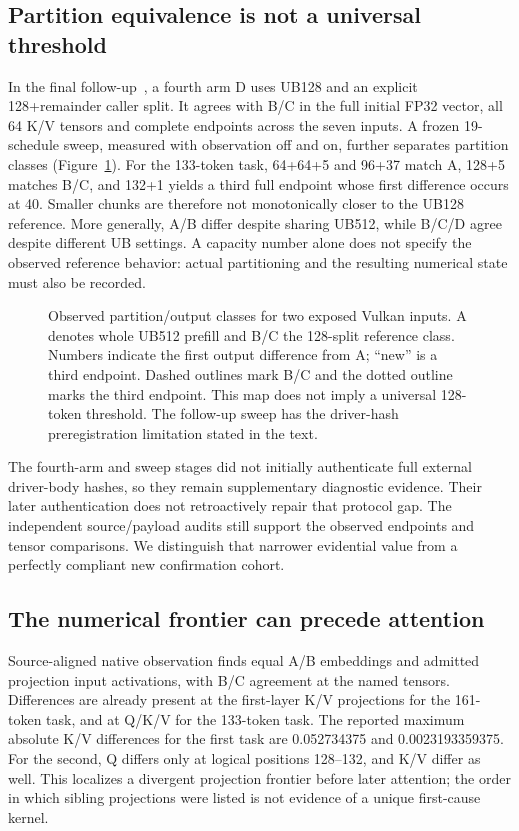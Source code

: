 \subsection{Partition equivalence is not a universal threshold}
In the final follow-up~\cite{bfinal}, a fourth arm D uses UB128 and an explicit 128+remainder caller split. It agrees with B/C in the full initial FP32 vector, all 64 K/V tensors and complete endpoints across the seven inputs. A frozen 19-schedule sweep, measured with observation off and on, further separates partition classes (Figure~\ref{fig:partition}). For the 133-token task, 64+64+5 and 96+37 match A, 128+5 matches B/C, and 132+1 yields a third full endpoint whose first difference occurs at 40. Smaller chunks are therefore not monotonically closer to the UB128 reference. More generally, A/B differ despite sharing UB512, while B/C/D agree despite different UB settings. A capacity number alone does not specify the observed reference behavior: actual partitioning and the resulting numerical state must also be recorded.

\begin{figure}[t]
\centering
\caption{Observed partition/output classes for two exposed Vulkan inputs. A denotes whole UB512 prefill and B/C the 128-split reference class. Numbers indicate the first output difference from A; ``new'' is a third endpoint. Dashed outlines mark B/C and the dotted outline marks the third endpoint. This map does not imply a universal 128-token threshold. The follow-up sweep has the driver-hash preregistration limitation stated in the text.}
\label{fig:partition}
\end{figure}

The fourth-arm and sweep stages did not initially authenticate full external driver-body hashes, so they remain supplementary diagnostic evidence. Their later authentication does not retroactively repair that protocol gap. The independent source/payload audits still support the observed endpoints and tensor comparisons. We distinguish that narrower evidential value from a perfectly compliant new confirmation cohort.

\subsection{The numerical frontier can precede attention}
Source-aligned native observation finds equal A/B embeddings and admitted projection input activations, with B/C agreement at the named tensors. Differences are already present at the first-layer K/V projections for the 161-token task, and at Q/K/V for the 133-token task. The reported maximum absolute K/V differences for the first task are 0.052734375 and 0.0023193359375. For the second, Q differs only at logical positions 128--132, and K/V differ as well. This localizes a divergent projection frontier before later attention; the order in which sibling projections were listed is not evidence of a unique first-cause kernel.

